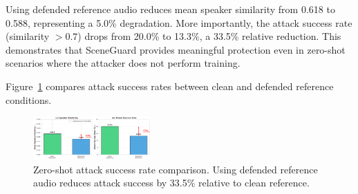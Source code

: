 Using defended reference audio reduces mean speaker similarity from 0.618 to 0.588, representing a 5.0\% degradation. More importantly, the attack success rate (similarity $> 0.7$) drops from 20.0\% to 13.3\%, a 33.5\% relative reduction. This demonstrates that SceneGuard provides meaningful protection even in zero-shot scenarios where the attacker does not perform training.

Figure~\ref{fig:zeroshot} compares attack success rates between clean and defended reference conditions.

\begin{figure}[t]
\centering
\includegraphics[width=0.4\textwidth]{figures/fig5_zeroshot.pdf}
\caption{Zero-shot attack success rate comparison. Using defended reference audio reduces attack success by 33.5\% relative to clean reference.}
\label{fig:zeroshot}
\end{figure}

